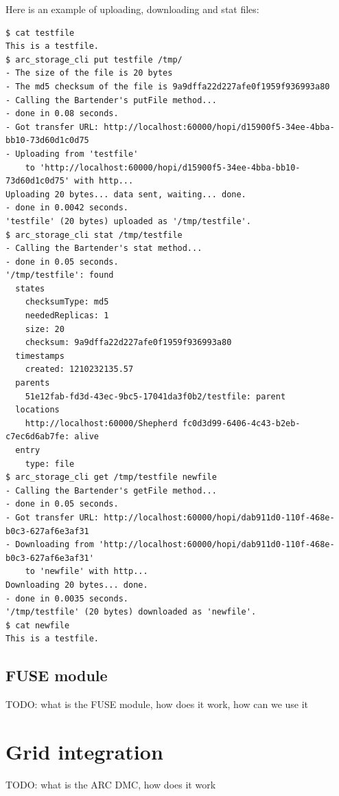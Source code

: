 \documentclass{book}
\begin{document}
Here is an example of uploading, downloading and stat files:

\begin{verbatim}
$ cat testfile 
This is a testfile.
$ arc_storage_cli put testfile /tmp/
- The size of the file is 20 bytes
- The md5 checksum of the file is 9a9dffa22d227afe0f1959f936993a80
- Calling the Bartender's putFile method...
- done in 0.08 seconds.
- Got transfer URL: http://localhost:60000/hopi/d15900f5-34ee-4bba-bb10-73d60d1c0d75
- Uploading from 'testfile'
    to 'http://localhost:60000/hopi/d15900f5-34ee-4bba-bb10-73d60d1c0d75' with http...
Uploading 20 bytes... data sent, waiting... done.
- done in 0.0042 seconds.
'testfile' (20 bytes) uploaded as '/tmp/testfile'.
$ arc_storage_cli stat /tmp/testfile
- Calling the Bartender's stat method...
- done in 0.05 seconds.
'/tmp/testfile': found
  states
    checksumType: md5
    neededReplicas: 1
    size: 20
    checksum: 9a9dffa22d227afe0f1959f936993a80
  timestamps
    created: 1210232135.57
  parents
    51e12fab-fd3d-43ec-9bc5-17041da3f0b2/testfile: parent
  locations
    http://localhost:60000/Shepherd fc0d3d99-6406-4c43-b2eb-c7ec6d6ab7fe: alive
  entry
    type: file
$ arc_storage_cli get /tmp/testfile newfile
- Calling the Bartender's getFile method...
- done in 0.05 seconds.
- Got transfer URL: http://localhost:60000/hopi/dab911d0-110f-468e-b0c3-627af6e3af31
- Downloading from 'http://localhost:60000/hopi/dab911d0-110f-468e-b0c3-627af6e3af31'
    to 'newfile' with http...
Downloading 20 bytes... done.
- done in 0.0035 seconds.
'/tmp/testfile' (20 bytes) downloaded as 'newfile'.
$ cat newfile 
This is a testfile.
\end{verbatim}


\subsection{FUSE module} %
\label{sub:fuse_module}

TODO: what is the FUSE module, how does it work, how can we use it



\section{Grid integration} %
\label{sec:grid_integration}

TODO: what is the ARC DMC, how does it work



% 
\end{document}
